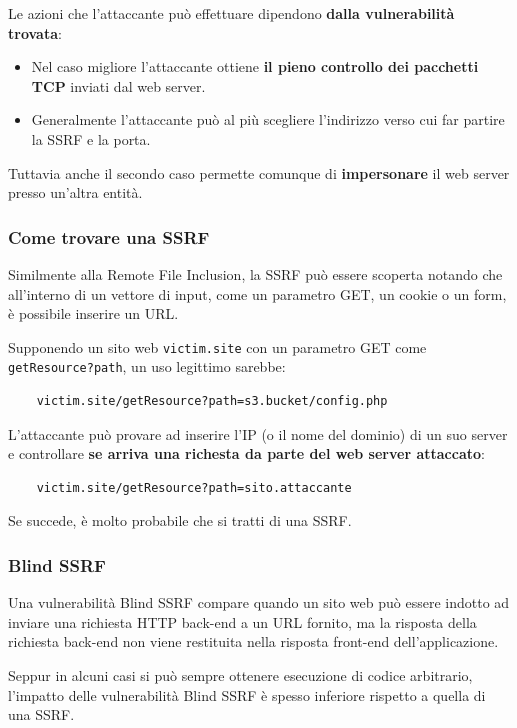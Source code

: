 \documentclass{article}
\begin{document}
Le azioni che l'attaccante può effettuare dipendono \textbf{dalla vulnerabilità trovata}:
\begin{itemize}
	\item Nel caso migliore l'attaccante ottiene \textbf{il pieno controllo dei pacchetti TCP} inviati dal web server.
	
	\item Generalmente l'attaccante può al più scegliere l'indirizzo verso cui far partire la SSRF e la porta.  
\end{itemize}

Tuttavia anche il secondo caso permette comunque di \textbf{impersonare} il web server presso un'altra entità.


\subsubsection{Come trovare una SSRF}
Similmente alla Remote File Inclusion, la SSRF può essere scoperta notando che all'interno di un vettore di input, come un parametro GET, un cookie o un form, è possibile inserire un URL.

Supponendo un sito web \verb|victim.site| con un parametro GET come \verb|getResource?path|, un uso legittimo sarebbe:
\begin{verbatim}
	victim.site/getResource?path=s3.bucket/config.php
\end{verbatim}

L'attaccante può provare ad inserire l'IP (o il nome del dominio) di un suo server e controllare \textbf{se arriva una richesta da parte del web server attaccato}:
\begin{verbatim}
	victim.site/getResource?path=sito.attaccante
\end{verbatim}

Se succede, è molto probabile che si tratti di una SSRF.

\subsubsection{Blind SSRF}
Una vulnerabilità Blind SSRF compare quando un sito web può essere indotto ad inviare una richiesta HTTP back-end a un URL fornito, ma la risposta della richiesta back-end non viene restituita nella risposta front-end dell'applicazione.

Seppur in alcuni casi si può sempre ottenere esecuzione di codice arbitrario, l'impatto delle vulnerabilità Blind SSRF è spesso inferiore rispetto a quella di una SSRF. 
\end{document}
